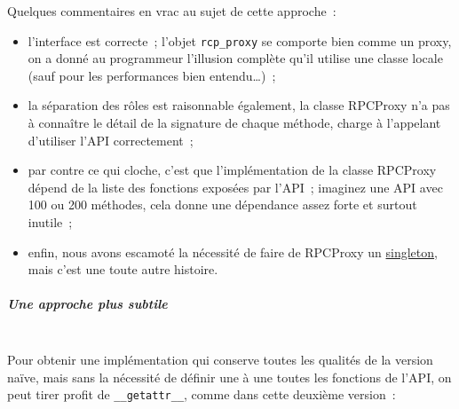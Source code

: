     Quelques commentaires en vrac au sujet de cette approche~:

\begin{itemize}
\tightlist
\item
  l'interface est correcte~; l'objet \texttt{rcp\_proxy} se comporte
  bien comme un proxy, on a donné au programmeur l'illusion complète
  qu'il utilise une classe locale (sauf pour les performances bien
  entendu\ldots{})~;
\item
  la séparation des rôles est raisonnable également, la classe RPCProxy
  n'a pas à connaître le détail de la signature de chaque méthode,
  charge à l'appelant d'utiliser l'API correctement~;
\item
  par contre ce qui cloche, c'est que l'implémentation de la classe
  RPCProxy dépend de la liste des fonctions exposées par l'API~;
  imaginez une API avec 100 ou 200 méthodes, cela donne une dépendance
  assez forte et surtout inutile~;
\item
  enfin, nous avons escamoté la nécessité de faire de RPCProxy un
  \href{http://en.wikipedia.org/wiki/Singleton_pattern}{singleton}, mais
  c'est une toute autre histoire.
\end{itemize}

    \hypertarget{une-approche-plus-subtile}{%
\subparagraph{Une approche plus
subtile\\\\}\label{une-approche-plus-subtile}}

    Pour obtenir une implémentation qui conserve toutes les qualités de la
version naïve, mais sans la nécessité de définir une à une toutes les
fonctions de l'API, on peut tirer profit de \texttt{\_\_getattr\_\_},
comme dans cette deuxième version~:

